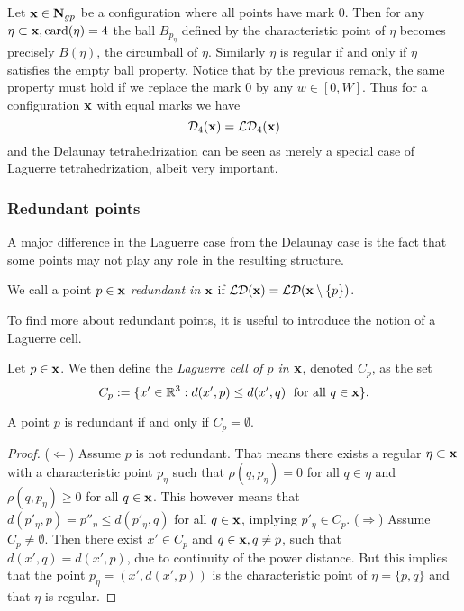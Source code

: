 \begin{remark}\label{rem:LaguerreToDelaunay}
	Let ${\mathbf{x}} \in \mathbf N_{gp}$ be a configuration where all points have mark $0$. Then for any $\eta \subset {\mathbf{x}}, \mathrm{card}(\eta)=4$ the ball $B_{p_\eta}$ defined by the characteristic point of $\eta$ becomes precisely $B(\eta)$, the circumball of $\eta$. Similarly $\eta$ is regular if and only if $\eta$ satisfies the empty ball property. Notice that by the previous remark, the same property must hold if we replace the mark $0$ by any $w\in[0,W]$. Thus for a configuration ${\mathbf{x}}$ with equal marks we have 
	$$\mathcal D_4({\mathbf{x}})=\mathcal {LD}_4({\mathbf{x}})$$ 
	and the Delaunay tetrahedrization can be seen as merely a special case of Laguerre tetrahedrization, albeit very important.
\end{remark}


\subsubsection{Redundant points}\label{sec:redundant}

A major difference in the Laguerre case from the Delaunay case is the fact that some points may not play any role in the resulting structure.

\begin{definition}
	We call a point $p \in {\mathbf{x}}$ \textit{redundant in} ${\mathbf{x}}$ if $\mathcal {LD}({\mathbf{x}}) = \mathcal {LD}({\mathbf{x}} \setminus \{p\})$.
\end{definition}

To find more about redundant points, it is useful to introduce the notion of a Laguerre cell.

\begin{definition}
Let $p\in {\mathbf{x}}$. We then define the \textit{Laguerre cell of $p$ in ${\mathbf{x}}$}, denoted $C_p$, as the set
$$C_p := \{x' \in {\mathbb R^3}: d(x',p) \leq d(x',q) \; \text{ for all } q \in {\mathbf{x}}\}.$$ 
\end{definition}

\begin{proposition}
	A point $p$ is redundant if and only if $C_p=\emptyset$.
\end{proposition}
\begin{proof}
	($\Leftarrow$) Assume $p$ is not redundant. That means there exists a regular $\eta\subset {\mathbf{x}}$ with a characteristic point $p_\eta$ such that $\rho(q,p_\eta)=0$ for all $q\in\eta$ and $\rho(q,p_\eta)\geq 0$ for all $q\in {\mathbf{x}}$. This however means that $d(p'_\eta,p) = p''_\eta \leq d(p'_\eta,q)$ for all $q\in{\mathbf{x}}$, implying $p'_\eta \in C_p$. \newline
	($\Rightarrow$) Assume $C_p \neq \emptyset$. Then there exist $x' \in C_p$ and $q\in{\mathbf{x}}, q\neq p$, such that $d(x',q)=d(x',p)$, due to continuity of the power distance. But this implies that the point $p_\eta = (x', d(x',p))$ is the characteristic point of $\eta=\{p,q\}$ and that $\eta$ is regular.
\end{proof}

